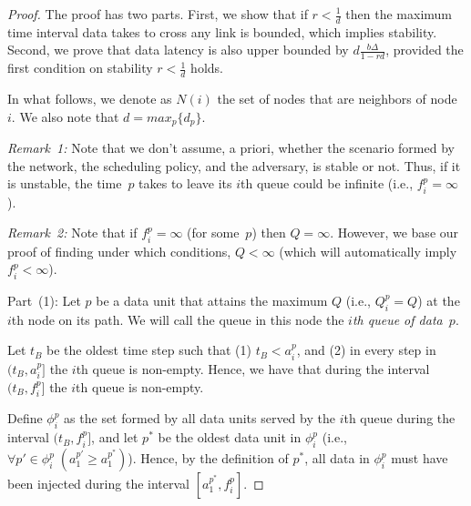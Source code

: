 \documentclass[journal,twocolumn]{./IEEEtran}
\begin{document}
\begin{proof}
The proof has two parts. First, we 
show
that if $r < \frac{1}{d}$ then the maximum time interval data takes to cross any link is bounded, which implies stability. Second, we prove that
data latency
is also upper bounded 
by $d \frac{b \Delta}{1-rd}$, provided the first condition on stability $r<\frac{1}{d}$ holds.

In what follows, we denote as $N(i)$ the set of nodes that are neighbors of node~$i$. We also note that $d=max_{p}\{d_p\}$.

\emph{Remark~1:} Note that we don't assume, a priori, whether the scenario formed by the network, the scheduling policy, and the adversary, is stable or not. Thus, if it is unstable, the time~$p$ takes to leave its $i$th queue could be infinite (i.e., $f_i^{p} = \infty$). 


\emph{Remark~2:} Note that if $f_i^{p} = \infty$ (for some~$p$) then $Q=\infty$. However, we base our proof of finding under which conditions, $Q < \infty$ (which will automatically imply $f_i^{p} < \infty$).

Part~(1):  Let $p$ be a data unit that attains the maximum $Q$ (i.e., $Q_i^p =Q$) at the $i$th node on its path. We will call the queue in this node the {\em $i$th queue of data~$p$}.

Let $t_B$ be the oldest time step such that (1) $t_B < a_i^p$, and (2) in every step in $(t_B,a_i^p]$ the $i$th queue is non-empty. Hence, we have that during the interval $(t_B,f_i^p]$ the $i$th queue is non-empty.

Define $\phi_i^{p}$ as the set formed by all data units served by the $i$th queue during the interval $(t_B,f_i^p]$, and let $p^{*}$ be the oldest data unit in $\phi_i^{p}$ (i.e., $\forall p' \in \phi_i^{p}\; (a_1^{p'}\geq a_1^{p^{*}})$).  Hence, by the definition of $p^{*}$, all data in $\phi_i^{p}$ must have been injected during the interval $[a_1^{p^{*}}, f_i^{p}]$. 




\end{proof}
\end{document}

